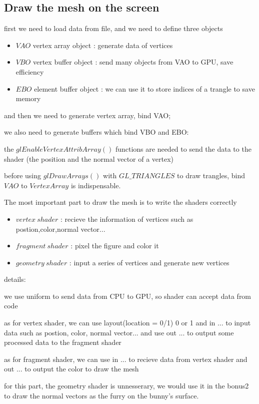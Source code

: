 \documentclass[acmtog]{acmart}
\begin{document}
\subsection{Draw the mesh on the screen}
first we need to load data from file, and we need to define three objects
\begin{itemize}
\item \(VAO\) vertex array object : generate data of vertices
\item \(VBO\) vertex buffer object : send many objects from VAO to GPU, save efficiency
\item \(EBO\)  element buffer object : we can use it to store indices of a trangle to save memory
\end{itemize}
and then we need to generate vertex array, bind VAO;

we also need to generate buffers which bind VBO and EBO:

the \(glEnableVertexAttribArray()\) functions are needed to send the data to the shader
(the position and the normal vector of a vertex)

before using \(glDrawArrays()\) with \(GL\_TRIANGLES\) to draw trangles, bind \(VAO\) to \(VertexArray\) is indispensable.

The most important part to draw the mesh is to write the shaders correctly

\begin{itemize}
\item \(vertex \ shader\)   : recieve the information of vertices such as postion,color,normal vector...
\item \(fragment \ shader\) : pixel the figure and color it
\item \(geometry \ shader\) : input a series of vertices and generate new vertices
\end{itemize}

details:

we use uniform to send data from CPU to GPU, so shader can accept data from code

as for vertex shader, we can use layout(location = 0/1) 0 or 1 and in ... to input data 
such as postion, color, normal vector...
and use out ... to output some processed data to the fragment shader

as for fragment shader, we can use in ... to recieve data from vertex shader
and out ... to output the color to draw the mesh

for this part, the geometry shader is unnesserary, we would use it in the bonus2 to 
draw the normal vectors as the furry on the bunny's surface.
\end{document}
